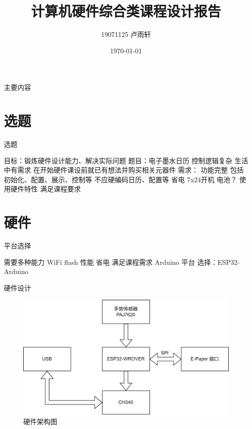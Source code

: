 \documentclass{ctexbeamer}
\title{计算机硬件综合类课程设计报告}
\author{19071125 卢雨轩}
\date{\today}
\begin{document}
\maketitle

\begin{frame}{主要内容}
    \tableofcontents
\end{frame}

\section{选题}

\begin{frame}{选题}
    \begin{outline}
        \1 目标：锻炼硬件设计能力、解决实际问题
        \1 题目：电子墨水日历
            \2 控制逻辑复杂
            \2 生活中有需求
                \3 在开始硬件课设前就已有想法并购买相关元器件
        \1 需求：
            \2 功能完整
                \3 包括初始化、配置、展示、控制等
                \3 不应硬编码日历、配置等
            \2 省电
                \3 7x24开机
                \3 电池？
            \2 使用硬件特性
                \3 满足课程要求
    \end{outline}
\end{frame}

\section{硬件}

\begin{frame}{平台选择}
    \begin{outline}
        \1 需要多种能力
            \2 WiFi
            \2 flash
            \2 性能
            \2 省电
        \1 满足课程需求
            \2 Arduino 平台
        \1 选择：ESP32-Arduino
    \end{outline}
\end{frame}

\begin{frame}{硬件设计}
    \begin{figure}[htp]
        \centering
        \includegraphics[width=.8\linewidth]{image2.png}
        \caption{硬件架构图}
    \end{figure}
\end{frame}
\end{document}
